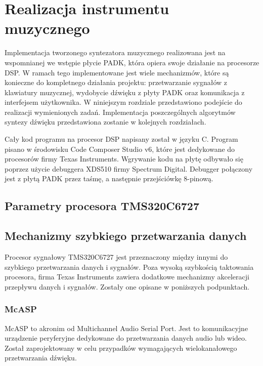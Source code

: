 \chapter{Realizacja instrumentu muzycznego}
Implementacja tworzonego syntezatora muzycznego realizowana jest na wspomnianej we wstępie płycie PADK, która opiera swoje działanie na procesorze DSP. W ramach tego implementowane jest wiele mechanizmów, które są konieczne do kompletnego działania projektu: przetwarzanie sygnałów z klawiatury muzycznej, wydobycie dźwięku z płyty PADK oraz komunikacja z interfejsem użytkownika. W niniejszym rozdziale przedstawiono podejście do realizacji wymienionych zadań. Implementacja poszczególnych algorytmów syntezy dźwięku przedstawiona zostanie w kolejnych rozdziałach.

Cały kod programu na procesor DSP napisany został w języku C. Program pisano w środowisku Code Composer Studio v6, które jest dedykowane do procesorów firmy Texas Instruments. Wgrywanie kodu na płytę odbywało się poprzez użycie debuggera XDS510 firmy Spectrum Digital. Debugger połączony jest z płytą PADK przez taśmę, a następnie przejściówkę 8-pinową.


\section{Parametry procesora TMS320C6727}

\section{Mechanizmy szybkiego przetwarzania danych}
Procesor sygnałowy TMS320C6727 jest przeznaczony między innymi do szybkiego przetwarzania danych i sygnałów. Poza wysoką szybkością taktowania procesora, firma Texas Instruments zawiera dodatkowe mechanizmy akceleracji przepływu danych i sygnałów. Zostały one opisane w poniższych podpunktach.

\subsection{McASP}
McASP to akronim od Multichannel Audio Serial Port. Jest to komunikacyjne urządzenie peryferyjne dedykowane do przetwarzania danych audio lub wideo. Został zaprojektowany w celu przypadków wymagających wielokanałowego przetwarzania dźwięku.

